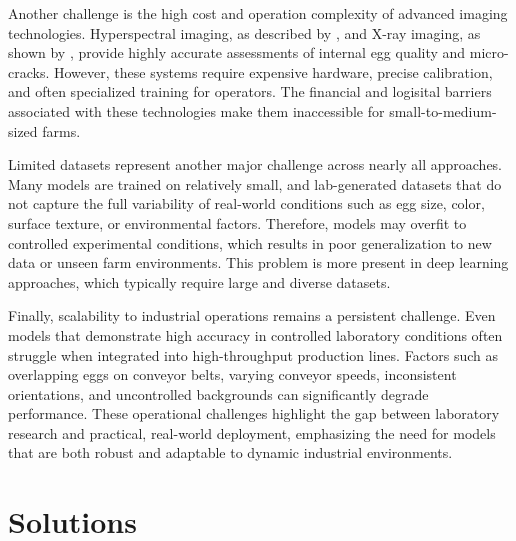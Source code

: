 \documentclass[conference]{IEEEtran}
\begin{document}
	Another challenge is the high cost and operation complexity of advanced imaging technologies. Hyperspectral imaging, as described by \cite{li2021hsi}, and X-ray imaging, as shown by \cite{kumar2023xray}, provide highly accurate assessments of internal egg quality and micro-cracks. However, these systems require expensive hardware, precise calibration, and often specialized training for operators. The financial and logisital barriers associated with these technologies make them inaccessible for small-to-medium-sized farms.
	
	Limited datasets represent another major challenge across nearly all approaches. Many models are trained on relatively small, and lab-generated datasets that do not capture the full variability of real-world conditions such as egg size, color, surface texture, or environmental factors. Therefore, models may overfit to controlled experimental conditions, which results in poor generalization to new data or unseen farm environments. This problem is more present in deep learning approaches, which typically require large and diverse datasets.
	
	Finally, scalability to industrial operations remains a persistent challenge. Even models that demonstrate high accuracy in controlled laboratory conditions often struggle when integrated into high-throughput production lines. Factors such as overlapping eggs on conveyor belts, varying conveyor speeds, inconsistent orientations, and uncontrolled backgrounds can significantly degrade performance. These operational challenges highlight the gap between laboratory research and practical, real-world deployment, emphasizing the need for models that are both robust and adaptable to dynamic industrial environments. \\
	

	
	\section{Solutions}
	
\end{document}
